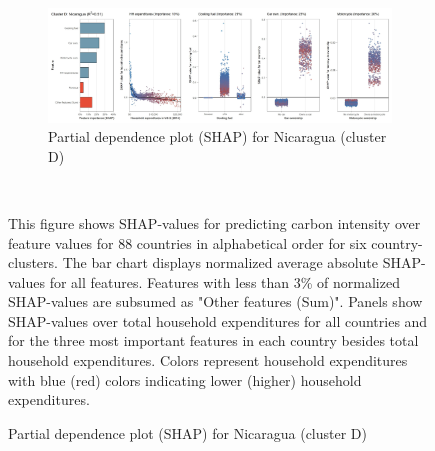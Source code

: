 \begin{figure}[ht!]
    \vspace{0.5cm}
   \begin{subfigure}[b]{\textwidth} 
   \centering
         \caption{Partial dependence plot (SHAP) for Nicaragua (cluster D)}
         \label{fig:5b_NIC}
         \includegraphics[width=\textwidth]{Figure 5b/Figure_5b_NIC}    
   \end{subfigure}
    \\
    \vspace{0.5cm}
   
    \begin{subcaption2}
     This figure shows SHAP-values for predicting carbon intensity over feature values for 88 countries in alphabetical order for six country-clusters. The bar chart displays normalized average absolute SHAP-values for all features. Features with less than 3\% of normalized SHAP-values are subsumed as "Other features (Sum)". Panels show SHAP-values over total household expenditures for all countries and for the three most important features in each country besides total household expenditures. Colors represent household expenditures with blue (red) colors indicating lower (higher) household expenditures.
     \end{subcaption2}
\end{figure}

